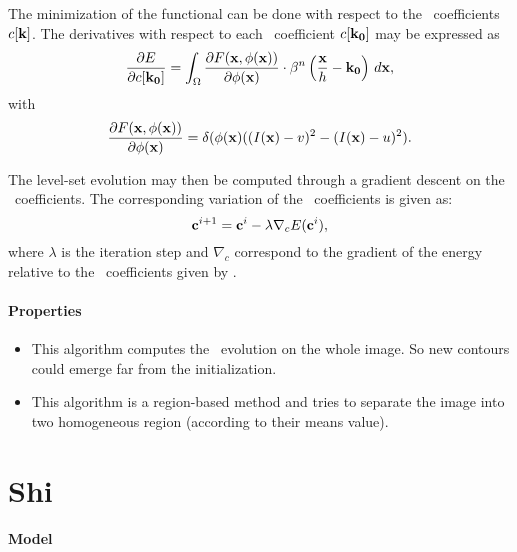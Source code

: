 The minimization of the functional  can be done with respect to the \bs~coefficients $c[\mathbf{k}]$. The derivatives with respect to each \bs~coefficient $c[\mathbf{k}_{\textbf{0}}]$ may be expressed as
\begin{equation}
	\label{eq:dEdck-bernard}
	\frac{\partial E}{\partial c[\mathbf{k}_{\mathbf{0}}]} = \int_{\Omega}{\frac{\partial F(\mathbf{x},\phi(\mathbf{x}))}{\partial \phi(\mathbf{x})} \cdot \beta^{n}\left( \frac{\mathbf{x}}{h} - \mathbf{k}_{\mathbf{0}} \right) \, d\mathbf{x}},
\end{equation}
with 
\begin{equation}
	\label{eq:gradF-bernard}
	\frac{\partial F(\mathbf{x},\phi(\mathbf{x}))}{\partial \phi(\mathbf{x})} = \delta(\phi(\mathbf{x})( (I(\mathbf{x})-v)^2 - (I(\mathbf{x}) - u)^2 ).
\end{equation}

The level-set evolution may then be computed through a gradient descent on the \bs~coefficients. The corresponding variation of the \bs~coefficients is given as:
\begin{equation}
	\label{eq:evol-bernard}
	\mathbf{c}^{i+1} = \mathbf{c}^{i} - \lambda\nabla_{c}E(\mathbf{c}^{i}),
\end{equation}
where $\lambda$ is the iteration step and $\nabla_{c}$ correspond to the gradient of the energy relative to the \bs~coefficients given by .

\paragraph{Properties}

\begin{itemize}
	\item This algorithm computes the \ls~evolution on the whole image. So new contours could emerge far from the initialization.
	\item This algorithm is a region-based method and tries to separate the image into two homogeneous region (according to their means value).
\end{itemize}


\newpage
\section[Shi]{Shi \cite{Shi2008}}
\label{sec:Shi}

\paragraph{Model}
~\par \vspace{0.3cm}

